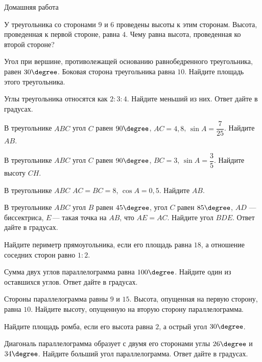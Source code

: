 \begin{homework}[number=1]
		\begin{listofex}
			\item Домашняя работа
		\end{listofex}
\end{homework}

\begin{class}[number=2]
	\begin{listofex}
		\item У треугольника со сторонами \( 9 \) и \( 6 \) проведены высоты к этим сторонам. Высота, проведенная к первой стороне, равна \( 4 \). Чему равна высота, проведенная ко второй стороне?
		\item Угол при вершине, противолежащей основанию равнобедренного треугольника, равен \( 30\degree \). Боковая сторона треугольника равна \( 10 \). Найдите площадь этого треугольника.
		\item Углы треугольника относятся как \( 2:3:4 \). Найдите меньший из них. Ответ дайте в градусах.
		\item В треугольнике \( ABC \) угол \( C \) равен \( 90\degree \), \( AC=4,8 \),  \( \sin A=\dfrac{7}{25} \).  Найдите \( AB \).
		\item В треугольнике \( ABC \) угол \( C \) равен \( 90\degree \), \( BC=3 \),  \( \sin A=\dfrac{3}{5} \).  Найдите высоту \( CH \).
		\item В треугольнике \( ABC \) \( AC=BC=8 \),  \( \cos A=0,5 \). Найдите \( AB \).
		\item В треугольнике \( ABC \) угол \( B \) равен \( 45\degree \), угол \( C \) равен \( 85\degree \), \( AD \) --- биссектриса, \( E \) --- такая точка на \( AB \), что \( AE=AC \). Найдите угол \( BDE \). Ответ дайте в градусах.
		\item Найдите периметр прямоугольника, если его площадь равна \( 18 \), а отношение соседних сторон равно \( 1:2 \).
		\item Сумма двух углов параллелограмма равна \( 100\degree \). Найдите один из оставшихся углов. Ответ дайте в градусах.
		\item Стороны параллелограмма равны \( 9 \) и \( 15 \). Высота, опущенная на первую сторону, равна \( 10 \). Найдите высоту, опущенную на вторую сторону параллелограмма.
		\item Найдите площадь ромба, если его высота равна \( 2 \), а острый угол \( 30\degree \).
		\item Диагональ параллелограмма образует с двумя его сторонами углы \( 26\degree \) и \( 34\degree \). Найдите больший угол параллелограмма. Ответ дайте в градусах.

\end{listofex}
\end{class}

